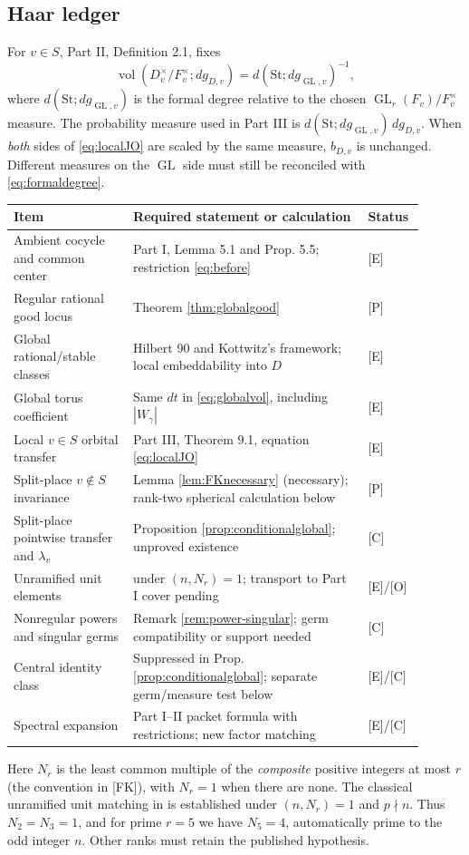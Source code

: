 \documentclass[11pt]{article}
\newcommand{\GL}{\operatorname{GL}}
\newcommand{\vol}{\operatorname{vol}}
\theoremstyle{plain}
\theoremstyle{definition}
\begin{document}
\subsection{Haar ledger}\label{subsec:ledger}
For $v\in S$, Part II, Definition 2.1, fixes
\begin{equation}\label{eq:formaldegree}
 \vol(D_v^\times/F_v^\times;dg_{D,v})
 =d(\mathrm{St};dg_{\GL,v})^{-1},
\end{equation}
where $d(\mathrm{St};dg_{\GL,v})$ is the formal degree
relative to the chosen $\GL_r(F_v)/F_v^\times$ measure.
The probability measure used in Part III is
$d(\mathrm{St};dg_{\GL,v})\,dg_{D,v}$.
When \emph{both} sides of \eqref{eq:localJO} are scaled by the
same measure, $b_{D,v}$ is unchanged.  Different measures on the
$\GL$ side must still be reconciled with \eqref{eq:formaldegree}.

\begin{center}\small
\begin{longtable}{@{}p{0.27\linewidth}p{0.53\linewidth}p{0.10\linewidth}@{}}
\toprule
Item & Required statement or calculation & Status\\\midrule
\endhead
Ambient cocycle and common center & Part I, Lemma 5.1 and Prop. 5.5; restriction \eqref{eq:before} & [E]\\
Regular rational good locus & Theorem \ref{thm:globalgood} & [P]\\
Global rational/stable classes & Hilbert 90 and Kottwitz's framework; local embeddability into $D$ & [E]\\
Global torus coefficient & Same $dt$ in \eqref{eq:globalvol}, including $|W_\gamma|$ & [E]\\
Local $v\in S$ orbital transfer & Part III, Theorem 9.1, equation \eqref{eq:localJO} & [E]\\
Split-place $v\notin S$ invariance & Lemma \ref{lem:FKnecessary} (necessary); rank-two spherical calculation below & [P]\\
Split-place pointwise transfer and $\lambda_v$ & Proposition \ref{prop:conditionalglobal}; unproved existence & [C]\\
Unramified unit elements & \cite[\S\S11--12]{FK} under $(n,N_r)=1$; transport to Part I cover pending & [E]/[O]\\
Nonregular powers and singular germs & Remark \ref{rem:power-singular}; germ compatibility or support needed & [C]\\
Central identity class & Suppressed in Prop. \ref{prop:conditionalglobal}; separate germ/measure test below & [E]/[C]\\
Spectral expansion & Part I--II packet formula with restrictions; new factor matching & [E]/[C]\\
\bottomrule
\end{longtable}
\end{center}
Here $N_r$ is the least common multiple of the \emph{composite}
positive integers at most $r$ (the convention in [FK]), with $N_r=1$
when there are none.  The classical unramified unit matching in
\cite[\S12, Corollary]{FK} is established under $(n,N_r)=1$
and $p\nmid n$.  Thus $N_2=N_3=1$, and for prime $r=5$
we have $N_5=4$, automatically prime to the odd integer $n$.
Other ranks must retain the published hypothesis.
\end{document}
